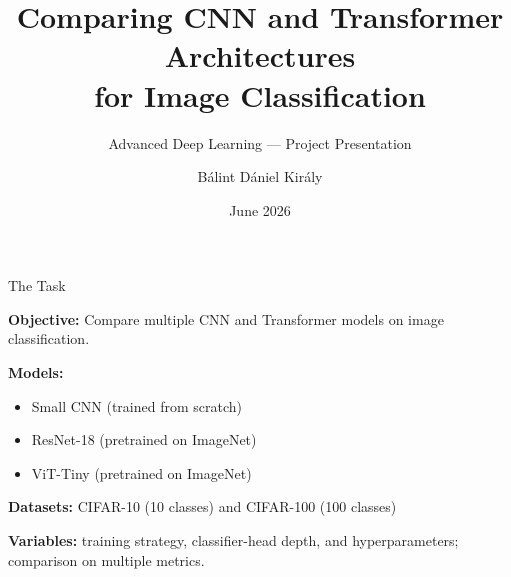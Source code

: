 \documentclass{beamer}
\title[CNN vs Transformer]{Comparing CNN and Transformer Architectures\\for Image Classification}
\subtitle{Advanced Deep Learning --- Project Presentation}
\author[B.~D.~Kir\'{a}ly]{B\'{a}lint D\'{a}niel Kir\'{a}ly}
\institute{E\"{o}tv\"{o}s Lor\'{a}nd University}
\date{June 2026}
\begin{document}
\begin{frame}
  \titlepage
\end{frame}

\begin{frame}{The Task}

  \textbf{Objective:} Compare multiple CNN and Transformer models on image classification.

  \bigskip
  \textbf{Models:}
  \begin{itemize}
    \item Small CNN (trained from scratch)
    \item ResNet-18 (pretrained on ImageNet)
    \item ViT-Tiny (pretrained on ImageNet)
  \end{itemize}

  \bigskip
  \textbf{Datasets:} CIFAR-10 (10 classes) and CIFAR-100 (100 classes)

  \bigskip
  \textbf{Variables:} training strategy, classifier-head depth, and hyperparameters;
  comparison on multiple metrics.


\end{frame}
\end{document}

